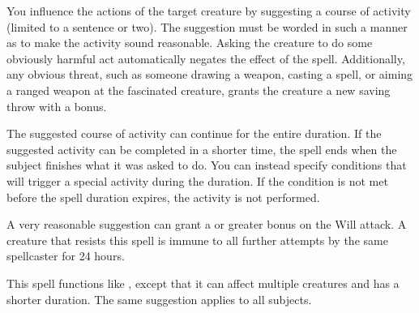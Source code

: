 \spellrng{\rngclose}
\begin{spelleffect}
  You influence the actions of the target creature by suggesting a course of activity (limited to a sentence or two). The suggestion must be worded in such a manner as to make the activity sound reasonable. Asking the creature to do some obviously harmful act automatically negates the effect of the spell. Additionally, any obvious threat, such as someone drawing a weapon, casting a spell, or aiming a ranged weapon at the fascinated creature, grants the creature a new saving throw with a  bonus.
  \par The suggested course of activity can continue for the entire duration. If the suggested activity can be completed in a shorter time, the spell ends when the subject finishes what it was asked to do. You can instead specify conditions that will trigger a special activity during the duration. If the condition is not met before the spell duration expires, the activity is not performed.
\end{spelleffect}
\begin{spellnotes}
  A very reasonable suggestion can grant a  or greater bonus on the Will attack. A creature that resists this spell is immune to all further attempts by the same spellcaster for 24 hours.
\end{spellnotes}

\spelldur{\durmed}
\begin{spelleffect}
  This spell functions like , except that it can affect multiple creatures and has a shorter duration. The same suggestion applies to all subjects.
\end{spelleffect}

